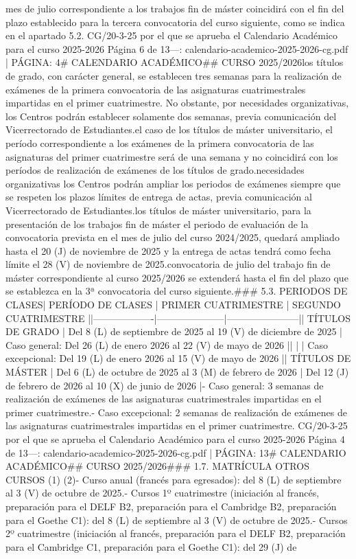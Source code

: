 \documentclass{article}
\begin{document}
\begin{itemize}
{mes de julio correspondiente a los trabajos fin de máster coincidirá con el fin del plazo establecido para la tercera convocatoria del curso siguiente, como se indica en el apartado 5.2.\n{} CG/20-3-25 por el que se aprueba el Calendario Académico para el curso 2025-2026  Página 6 de 13\n\n---\n\nFUENTE: calendario-academico-2025-2026-cg.pdf | PÁGINA: 4\n# CALENDARIO ACADÉMICO\n## CURSO 2025/2026\n\nEn los títulos de grado, con carácter general, se establecen tres semanas para la realización de exámenes de la primera convocatoria de las asignaturas cuatrimestrales impartidas en el primer cuatrimestre. No obstante, por necesidades organizativas, los Centros podrán establecer solamente dos semanas, previa comunicación del Vicerrectorado de Estudiantes.\n\nPara el caso de los títulos de máster universitario, el período correspondiente a los exámenes de la primera convocatoria de las asignaturas del primer cuatrimestre será de una semana y no coincidirá con los períodos de realización de exámenes de los títulos de grado.\n\nPor necesidades organizativas los Centros podrán ampliar los periodos de exámenes siempre que se respeten los plazos límites de entrega de actas, previa comunicación al Vicerrectorado de Estudiantes.\n\nEn los títulos de máster universitario, para la presentación de los trabajos fin de máster el periodo de evaluación de la convocatoria prevista en el mes de julio del curso 2024/2025, quedará ampliado hasta el 20 (J) de noviembre de 2025 y la entrega de actas tendrá como fecha límite el 28 (V) de noviembre de 2025.\n\nLa convocatoria de julio del trabajo fin de máster correspondiente al curso 2025/2026 se extenderá hasta el fin del plazo que se establezca en la 3ª convocatoria del curso siguiente.\n\n### 5.3. PERIODOS DE CLASES\n\n| PERÍODO DE CLASES | PRIMER CUATRIMESTRE | SEGUNDO CUATRIMESTRE |\n|-------------------|---------------------|-----------------------|\n| TÍTULOS DE GRADO  | Del 8 (L) de septiembre de 2025 al 19 (V) de diciembre de 2025 | Caso general: Del 26 (L) de enero 2026 al 22 (V) de mayo de 2026 |\n|                   |                     | Caso excepcional: Del 19 (L) de enero 2026 al 15 (V) de mayo de 2026 |\n| TÍTULOS DE MÁSTER | Del 6 (L) de octubre de 2025 al 3 (M) de febrero de 2026 | Del 12 (J) de febrero de 2026 al 10 (X) de junio de 2026 |\n\n- Caso general: 3 semanas de realización de exámenes de las asignaturas cuatrimestrales impartidas en el primer cuatrimestre.\n- Caso excepcional: 2 semanas de realización de exámenes de las asignaturas cuatrimestrales impartidas en el primer cuatrimestre.\n{} CG/20-3-25 por el que se aprueba el Calendario Académico para el curso 2025-2026  Página 4 de 13\n\n---\n\nFUENTE: calendario-academico-2025-2026-cg.pdf | PÁGINA: 13\n# CALENDARIO ACADÉMICO\n## CURSO 2025/2026\n\n### 1.7. MATRÍCULA OTROS CURSOS (1) (2)\n\n- Curso anual (francés para egresados): del 8 (L) de septiembre al 3 (V) de octubre de 2025.\n- Cursos 1º cuatrimestre (iniciación al francés, preparación para el DELF B2, preparación para el Cambridge B2, preparación para el Goethe C1): del 8 (L) de septiembre al 3 (V) de octubre de 2025.\n- Cursos 2º cuatrimestre (iniciación al francés, preparación para el DELF B2, preparación para el Cambridge C1, preparación para el Goethe C1): del 29 (J) de }
\end{itemize}
\end{document}
